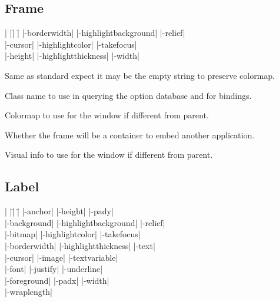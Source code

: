 \subsection*{Frame}
\vspace{-4pt}

\begin{tabbing}
|                   |\=|                     |\= \kill
|-borderwidth|      \> |-highlightbackground| \> |-relief| \\
|-cursor|           \> |-highlightcolor|      \> |-takefocus| \\
|-height|	    \> |-highlightthickness|  \> |-width| \\
\end{tabbing}

\vskip5pt
\begin{enum}{1cm}

Same as standard expect it may be the empty string to preserve colormap.

Class name to use in querying the option database and for bindings.

Colormap to use for the window if different from parent.

Whether the frame will be a container to embed another application.

Visual info to use for the window if different from parent.

\end{enum}

\subsection*{Label}
\vspace{-4pt}

\begin{tabbing}
|                   |\=|                     |\= \kill
|-anchor|           \> |-height|             \> |-pady| \\
|-background|       \> |-highlightbackground| \> |-relief| \\       
|-bitmap|           \> |-highlightcolor|     \> |-takefocus| \\
|-borderwidth|      \> |-highlightthickness| \> |-text| \\           
|-cursor|	    \> |-image|              \> |-textvariable| \\   
|-font|             \> |-justify|            \> |-underline| \\      
|-foreground|       \> |-padx|               \> |-width| \\          
		    \>			     \> |-wraplength| \\     
\end{tabbing}

